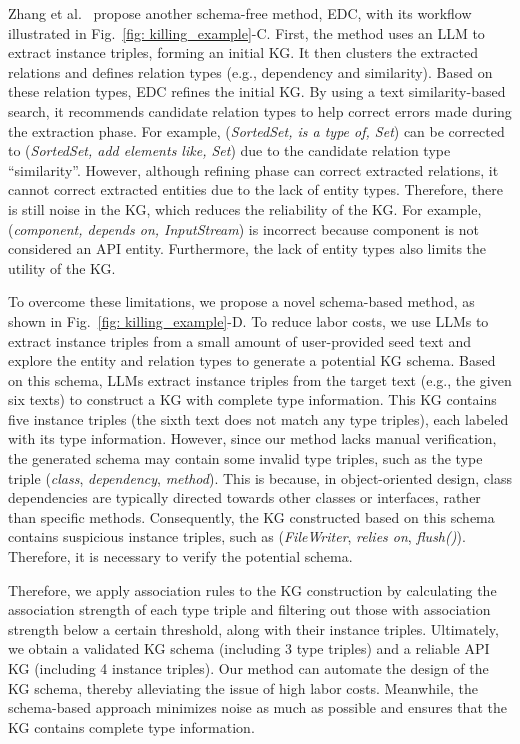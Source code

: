 Zhang et al.~\cite{EDC} propose another schema-free method, EDC, with its workflow illustrated in Fig.~\ref{fig: killing_example}-C.
First, the method uses an LLM to extract instance triples, forming an initial KG.
It then clusters the extracted relations and defines relation types (e.g., dependency and similarity).
Based on these relation types, EDC refines the initial KG.
By using a text similarity-based search, it recommends candidate relation types to help correct errors made during the extraction phase.
For example, (\textit{SortedSet, is a type of, Set}) can be corrected to (\textit{SortedSet, add elements like, Set}) due to the candidate relation type ``similarity''.
However, although refining phase can correct extracted relations, it cannot correct extracted entities due to the lack of entity types.
Therefore, there is still noise in the KG, which reduces the reliability of the KG.
For example, (\textit{component, depends on, InputStream}) is incorrect because component is not considered an API entity.
Furthermore, the lack of entity types also limits the utility of the KG.


To overcome these limitations, we propose a novel schema-based method, as shown in Fig.~\ref{fig: killing_example}-D.
To reduce labor costs, we use LLMs to extract instance triples from a small amount of user-provided seed text and explore the entity and relation types to generate a potential KG schema.
Based on this schema, LLMs extract instance triples from the target text (e.g., the given six texts) to construct a KG with complete type information.
This KG contains five instance triples (the sixth text does not match any type triples), each labeled with its type information.
However, since our method lacks manual verification, the generated schema may contain some invalid type triples, such as the type triple (\textit{class}, \textit{dependency}, \textit{method}).
This is because, in object-oriented design, class dependencies are typically directed towards other classes or interfaces, rather than specific methods.
Consequently, the KG constructed based on this schema contains suspicious instance triples, such as (\textit{FileWriter}, \textit{relies on}, \textit{flush()}).  
Therefore, it is necessary to verify the potential schema.

Therefore, we apply association rules to the KG construction by calculating the association strength of each type triple and filtering out those with association strength below a certain threshold, along with their instance triples.
Ultimately, we obtain a validated KG schema (including 3 type triples) and a reliable API KG (including 4 instance triples).
Our method can automate the design of the KG schema, thereby alleviating the issue of high labor costs.
Meanwhile, the schema-based approach minimizes noise as much as possible and ensures that the KG contains complete type information.


